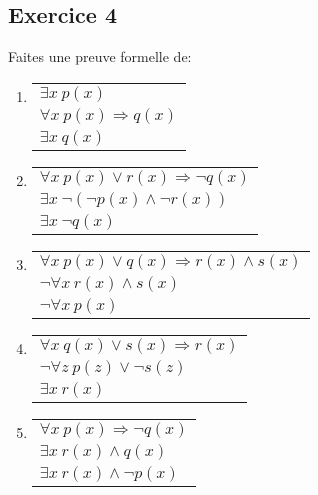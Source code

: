 \subsection*{Exercice 4}
Faites une preuve formelle de:

\begin{enumerate}

	\item \enter
\begin{flushleft}
\begin{tabular}{l}
$\exists x \ p(x)$ \\
$\forall x \ p(x) \Rightarrow q(x)$ \\
\hline
$\exists x \ q(x)$
\end{tabular}
\end{flushleft}

	\item \enter
\begin{flushleft}
\begin{tabular}{l}
$\forall x \ p(x) \vee r(x) \Rightarrow \neg q(x)$ \\
$\exists x \ \neg (\neg p(x) \land \neg r(x))$ \\
\hline
$\exists x \ \neg q(x)$
\end{tabular}
\end{flushleft}

	\item \enter
\begin{flushleft}
\begin{tabular}{l}
$\forall x \ p(x) \vee q(x) \Rightarrow r(x) \land s(x)$ \\
$\neg \forall x \ r(x) \land s(x)$ \\
\hline
$\neg \forall x \ p(x)$
\end{tabular}
\end{flushleft}

\newpage

	\item \enter
\begin{flushleft}
\begin{tabular}{l}
$\forall x \ q(x) \vee s(x) \Rightarrow r(x) $ \\
$\neg \forall z \ p(z) \vee \neg s(z)$ \\
\hline
$\exists x \ r(x)$
\end{tabular}
\end{flushleft}

	\item \enter
\begin{flushleft}
\begin{tabular}{l}
$\forall x \ p(x) \Rightarrow \neg q(x)$ \\
$\exists x \ r(x) \land q(x)$ \\
\hline
$\exists x \ r(x) \land \neg p(x)$
\end{tabular}
\end{flushleft}


\end{enumerate}
